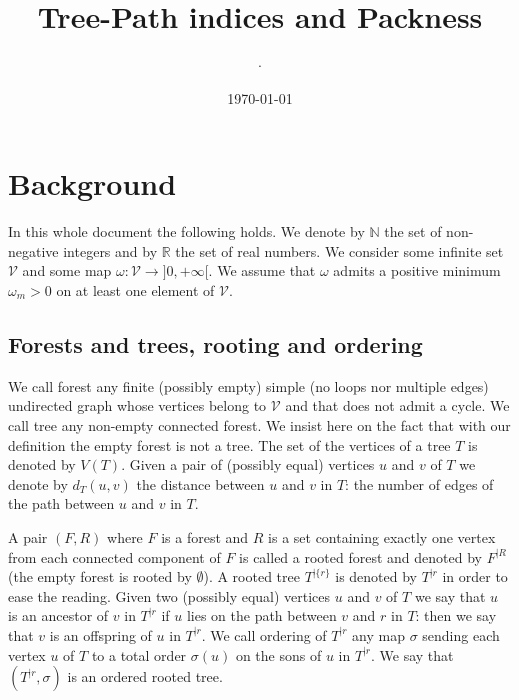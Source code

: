 \documentclass[11 pt]{modarticle}
\title{Tree-Path indices and Packness}
\date{\today}
\author[1]{$\cdot$}
\newcommand{\cN}{\mathbb{N}}
\newcommand{\cR}{\mathbb{R}}
\newcommand{\vset}{\mathcal{V}}
\newcommand{\wmap}{\omega}
\newcommand{\wmin}{\omega_m}
\newcommand{\vsetof}[1]{V(#1)}
\newcommand{\distance}[3]{d_{#3}(#1,#2)}
\newcommand{\rtree}[2]{{#1}^{\lvert #2}}
\newcommand{\ortree}[3]{(\rtree{#1}{#2},{#3})}
\begin{document}
\maketitle
\thispagestyle{empty} %

\begin{abstract}
\end{abstract}

\tableofcontents
	
\pagebreak

\section{Background}

In this whole document the following holds. We denote by $\cN$ the set of non-negative integers and by $\cR$ the set of real numbers. We consider some infinite set $\vset$ and some map $\wmap : \vset \to ]0,+\infty[$. We assume that $\wmap$ admits a positive minimum $\wmin > 0$ on at least one element of $\vset$.

\subsection{Forests and trees, rooting and ordering}

We call forest any finite (possibly empty) simple (no loops nor multiple edges) undirected graph whose vertices belong to $\vset$ and that does not admit a cycle. We call tree any non-empty connected forest. We insist here on the fact that with our definition the empty forest is not a tree. The set of the vertices of a tree $T$ is denoted by $\vsetof{T}$. Given a pair of (possibly equal) vertices $u$ and $v$ of $T$ we denote by $\distance{u}{v}{T}$ the distance between $u$ and $v$ in $T$: the number of edges of the path between $u$ and $v$ in $T$.

A pair $(F,R)$ where $F$ is a forest and $R$ is a set containing exactly one vertex from each connected component of $F$  is called a rooted forest and denoted by $\rtree{F}{R}$ (the empty forest is rooted by $\emptyset$). A rooted tree $\rtree{T}{\{r\}}$ is denoted by $\rtree{T}{r}$ in order to ease the reading. Given two (possibly equal) vertices $u$ and $v$ of $T$ we say that $u$ is an ancestor of $v$ in $\rtree{T}{r}$ if $u$ lies on the path between $v$ and $r$ in $T$: then we say that $v$ is an offspring of $u$ in $\rtree{T}{r}$. We call ordering of $\rtree{T}{r}$ any map $\sigma$ sending each vertex $u$ of $T$ to a total order $\sigma(u)$ on the sons of $u$ in $\rtree{T}{r}$. We say that $\ortree{T}{r}{\sigma}$ is an ordered rooted tree.
\end{document}
